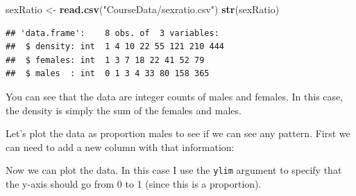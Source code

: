 \documentclass[
  a4paperpaper,
]{book}
\newenvironment{Shaded}{\begin{snugshade}}{\end{snugshade}}
\newcommand{\DataTypeTok}[1]{\textcolor[rgb]{0.13,0.29,0.53}{#1}}
\newcommand{\DecValTok}[1]{\textcolor[rgb]{0.00,0.00,0.81}{#1}}
\newcommand{\KeywordTok}[1]{\textcolor[rgb]{0.13,0.29,0.53}{\textbf{#1}}}
\newcommand{\NormalTok}[1]{#1}
\newcommand{\OperatorTok}[1]{\textcolor[rgb]{0.81,0.36,0.00}{\textbf{#1}}}
\newcommand{\StringTok}[1]{\textcolor[rgb]{0.31,0.60,0.02}{#1}}
\begin{document}
\begin{Shaded}
\begin{Highlighting}[]
\NormalTok{sexRatio \textless{}{-}}\StringTok{ }\KeywordTok{read.csv}\NormalTok{(}\StringTok{"CourseData/sexratio.csv"}\NormalTok{)}
\KeywordTok{str}\NormalTok{(sexRatio)}
\end{Highlighting}
\end{Shaded}

\begin{verbatim}
## 'data.frame':	8 obs. of  3 variables:
##  $ density: int  1 4 10 22 55 121 210 444
##  $ females: int  1 3 7 18 22 41 52 79
##  $ males  : int  0 1 3 4 33 80 158 365
\end{verbatim}

You can see that the data are integer counts of males and females. In this case, the density is simply the sum of the females and males.

Let's plot the data as proportion males to see if we can see any pattern. First we can need to add a new column with that information:

\begin{Shaded}
\end{Shaded}

Now we can plot the data. In this case I use the \texttt{ylim} argument to specify that the y-axis should go from 0 to 1 (since this is a proportion).

\begin{Shaded}
\end{Shaded}
\end{document}
